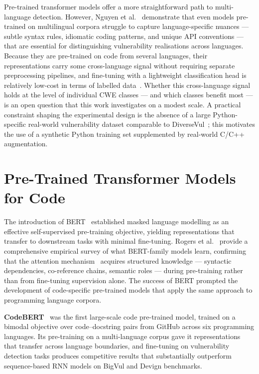 Pre-trained transformer models offer a more straightforward path to multi-language
detection.
However, Nguyen et al.~\cite{nguyen2025mulvuln} demonstrate that even models pre-trained on
multilingual corpora struggle to capture language-specific nuances --- subtle syntax
rules, idiomatic coding patterns, and unique API conventions --- that are essential for
distinguishing vulnerability realisations across languages.
Because they are pre-trained on code from several languages, their representations carry
some cross-language signal without requiring separate preprocessing pipelines, and
fine-tuning with a lightweight classification head is relatively low-cost in terms of
labelled data~\cite{xu2022detecting}.
Whether this cross-language signal holds at the level of individual CWE classes --- and
which classes benefit most --- is an open question that this work investigates on a
modest scale.
A practical constraint shaping the experimental design is the absence of a large
Python-specific real-world vulnerability dataset comparable to
DiverseVul~\cite{ni2023diversevul}; this motivates the use of a synthetic Python
training set supplemented by real-world C/C++ augmentation.

\section{Pre-Trained Transformer Models for Code}

The introduction of BERT~\cite{devlin2019bert} established masked language modelling as
an effective self-supervised pre-training objective, yielding representations that transfer
to downstream tasks with minimal fine-tuning.
Rogers et al.~\cite{rogers2020bertology} provide a comprehensive empirical survey of what BERT-family
models learn, confirming that the attention mechanism~\cite{vaswani2017attention}
acquires structured knowledge --- syntactic dependencies, co-reference chains, semantic
roles --- during pre-training rather than from fine-tuning supervision alone.
The success of BERT prompted the development of code-specific pre-trained models that
apply the same approach to programming language corpora.

\textbf{CodeBERT}~\cite{feng2020codebert} was the first large-scale code pre-trained
model, trained on a bimodal objective over code--docstring pairs from GitHub across six
programming languages.
Its pre-training on a multi-language corpus gave it representations that transfer across
language boundaries, and fine-tuning on vulnerability detection tasks produces competitive
results that substantially outperform sequence-based RNN models on BigVul and Devign
benchmarks.

